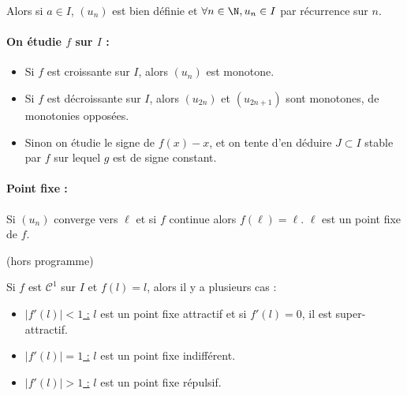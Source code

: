Alors si $a \in I$, $(u_n)$ est bien définie et $\forall n \in \N, u_n \in I$ par récurrence 
sur $n$. 

\paragraph{On étudie $f$ sur $I$ :}
\begin{itemize}
    \item Si $f$ est croissante sur $I$, alors $(u_n)$ est monotone.
    \item Si $f$ est décroissante sur $I$, alors $(u_{2n})$ et $(u_{2n + 1})$ sont monotones, de 
        monotonies opposées.
    \item Sinon on étudie le signe de $f(x) - x$, et on tente d'en déduire $J \subset I$ stable
        par $f$ sur lequel $g$ est de signe constant. 
\end{itemize}

\paragraph{Point fixe :}
Si $(u_n)$ converge vers $\ell$ et si $f$ continue alors $f(\ell) = \ell$. $\ell$ est un point fixe de $f$. \\

\begin{remarque}
    (hors programme)

    Si $f$ est $\mathscr C^1$ sur $I$ et $f(l) = l$, alors il y a plusieurs cas : 

    \begin{itemize}
        \item \uline{$|f'(l)| < 1$ :}
         $l$ est un point fixe attractif et si $f'(l) = 0$, il est super-attractif. 

        \item \uline{$|f'(l)| = 1$ :}
        $l$ est un point fixe indifférent. 

        \item \uline{$|f'(l)| > 1$ :}
        $l$ est un point fixe répulsif.
    \end{itemize}
\end{remarque}

